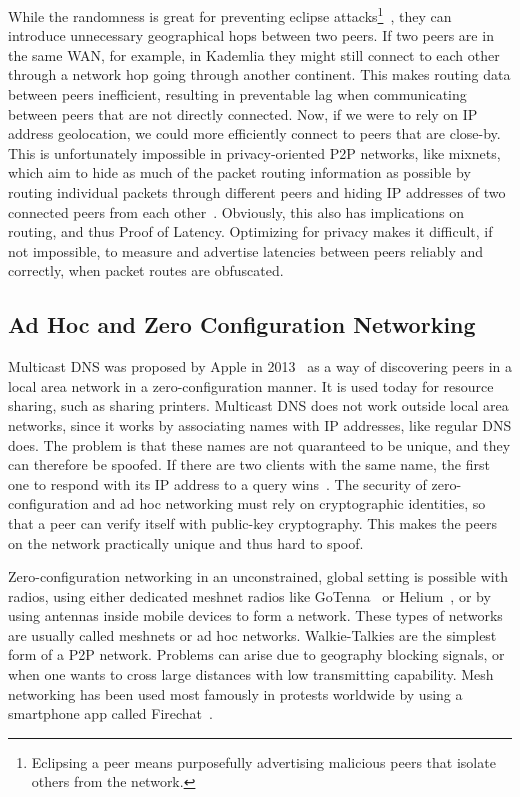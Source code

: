 While the randomness is great for preventing eclipse attacks\footnote{Eclipsing a peer means purposefully advertising malicious peers that isolate others from the network.}~\cite{Cai2015-ra}, they can introduce unnecessary geographical hops between two peers. If two peers are in the same WAN, for example, in Kademlia they might still connect to each other through a network hop going through another continent. This makes routing data between peers inefficient, resulting in preventable lag when communicating between peers that are not directly connected.
Now, if we were to rely on IP address geolocation, we could more efficiently connect to peers that are close-by. This is unfortunately impossible in privacy-oriented P2P networks, like mixnets, which aim to hide as much of the packet routing information as possible by routing individual packets through different peers and hiding IP addresses of two connected peers from each other~\cite{Harry_Halpin_undated-sq}. Obviously, this also has implications on routing, and thus Proof of Latency. Optimizing for privacy makes it difficult, if not impossible, to measure and advertise latencies between peers reliably and correctly, when packet routes are obfuscated.

\subsection{Ad Hoc and Zero Configuration Networking}
Multicast DNS was proposed by Apple in 2013~\cite{Cheshire2013-ja} as a way of discovering peers in a local area network in a zero-configuration manner. It is used today for resource sharing, such as sharing printers. Multicast DNS does not work outside local area networks, since it works by associating names with IP addresses, like regular DNS does. The problem is that these names are not quaranteed to be unique, and they can therefore be spoofed. If there are two clients with the same name, the first one to respond with its IP address to a query wins~\cite{Pdp2008-tg}. The security of zero-configuration and ad hoc networking must rely on cryptographic identities, so that a peer can verify itself with public-key cryptography. This makes the peers on the network practically unique and thus hard to spoof.

Zero-configuration networking in an unconstrained, global setting is possible with radios, using either dedicated meshnet radios like GoTenna~\cite{GoTenna_undated-km} or Helium~\cite{Helium_undated-jv}, or by using antennas inside mobile devices to form a network. These types of networks are usually called meshnets or ad hoc networks. Walkie-Talkies are the simplest form of a P2P network. Problems can arise due to geography blocking signals, or when one wants to cross large distances with low transmitting capability. Mesh networking has been used most famously in protests worldwide by using a smartphone app called Firechat~\cite{Milian2014-mt}.

